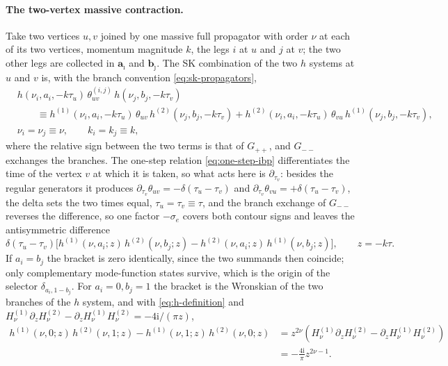\documentclass[11pt,a4paper]{article}
\newcommand{\nn}{\nonumber}
\newcommand{\ii}{\mathrm i}
\def\ie{\begin{equation}\begin{aligned}}
\def\fe{\end{aligned}\end{equation}}
\begin{document}
\paragraph{The two-vertex massive contraction.}
Take two vertices $u,v$ joined by one massive full propagator with order $\nu$ at each of its two vertices, momentum
magnitude $k$, the legs $i$ at $u$ and $j$ at $v$; the two other legs are collected in
$\bm a_{\hat\imath}$ and $\bm b_{\hat\jmath}$. The SK combination of the two $h$ systems at $u$ and $v$ is,
with the branch convention \eqref{eq:sk-propagators},
\ie
&h(\nu_{i},a_i,-k\tau_u)\,\theta^{(i,j)}_{uv}\,h(\nu_{j},b_j,-k\tau_v)
\nn\\
&\qquad\equiv
h^{(1)}(\nu_{i},a_i,-k\tau_u)\,\theta_{uv}\,h^{(2)}(\nu_{j},b_j,-k\tau_v)
+h^{(2)}(\nu_{i},a_i,-k\tau_u)\,\theta_{vu}\,h^{(1)}(\nu_{j},b_j,-k\tau_v),
\nn\\
&\nu_{i}=\nu_{j}\equiv\nu, \qquad k_{i}=k_{j}\equiv k,
\fe
where the relative sign between the two terms is that of $G_{++}$, and $G_{--}$ exchanges the
branches. The one-step relation \eqref{eq:one-step-ibp} differentiates the time of the vertex $v$ at
which it is taken, so what acts here is $\partial_{\tau_v}$: besides the regular generators it
produces $\partial_{\tau_v}\theta_{uv}=-\delta(\tau_u-\tau_v)$ and
$\partial_{\tau_v}\theta_{vu}=+\delta(\tau_u-\tau_v)$, the delta sets the two times equal,
$\tau_u=\tau_v\equiv\tau$, and the branch exchange of $G_{--}$ reverses the difference, so one factor
$-\sigma_e$ covers both contour signs and leaves the antisymmetric difference
\begin{equation}
  \delta(\tau_u-\tau_v)\Big[
  h^{(1)}(\nu,a_i;z)\,h^{(2)}(\nu,b_j;z)
  -h^{(2)}(\nu,a_i;z)\,h^{(1)}(\nu,b_j;z)\Big],
  \qquad z=-k\tau .
  \label{eq:R-antisym}
\end{equation}
If $a_i=b_j$ the bracket is zero identically, since the two summands then coincide; only
complementary mode-function states survive, which is the origin of the selector $\delta_{a_i,1-b_j}$. For
$a_i=0,b_j=1$ the bracket is the Wronskian of the two branches of the $h$ system, and with
\eqref{eq:h-definition} and $H^{(1)}_\nu\partial_zH^{(2)}_\nu-\partial_zH^{(1)}_\nu H^{(2)}_\nu
=-4\ii/(\pi z)$,
\begin{equation}
  \begin{aligned}
  h^{(1)}(\nu,0;z)\,h^{(2)}(\nu,1;z)-h^{(1)}(\nu,1;z)\,h^{(2)}(\nu,0;z)
  &=z^{2\nu}\left(H^{(1)}_\nu\partial_zH^{(2)}_\nu-\partial_zH^{(1)}_\nu H^{(2)}_\nu\right)\\
  &=-\frac{4\ii}{\pi}z^{2\nu-1}.
  \end{aligned}
  \label{eq:wronskian-h}
\end{equation}
\end{document}
